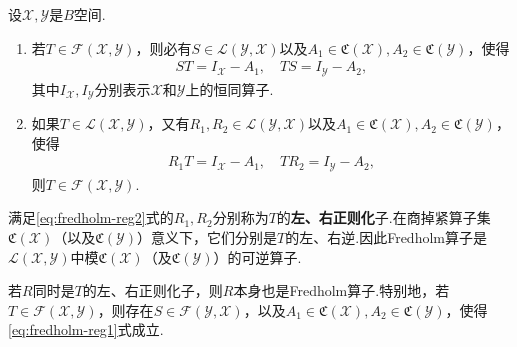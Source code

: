 \documentclass[../../main.tex]{subfiles}%
\begin{document}
\begin{theorem}\label{theorem:泛函分析--Fredholm算子正则化定理}
设$\mathscr{X},\mathscr{Y}$是$B$空间.
\begin{enumerate}[(1)]
\item 若$T\in\mathscr{F}(\mathscr{X},\mathscr{Y})$，则必有$S\in\mathscr{L}(\mathscr{Y},\mathscr{X})$以及$A_1\in\mathfrak{C}(\mathscr{X}),A_2\in\mathfrak{C}(\mathscr{Y})$，使得
\begin{align}
ST=I_{\mathscr{X}}-A_1,\quad TS=I_{\mathscr{Y}}-A_2,\label{eq:fredholm-reg1}
\end{align}
其中$I_{\mathscr{X}},I_{\mathscr{Y}}$分别表示$\mathscr{X}$和$\mathscr{Y}$上的恒同算子.
\item 如果$T\in\mathscr{L}(\mathscr{X},\mathscr{Y})$，又有$R_1,R_2\in\mathscr{L}(\mathscr{Y},\mathscr{X})$以及$A_1\in\mathfrak{C}(\mathscr{X}),A_2\in\mathfrak{C}(\mathscr{Y})$，使得
\begin{align}
R_1T=I_{\mathscr{X}}-A_1,\quad TR_2=I_{\mathscr{Y}}-A_2,\label{eq:fredholm-reg2}
\end{align}
则$T\in\mathscr{F}(\mathscr{X},\mathscr{Y})$.
\end{enumerate}
\end{theorem}
\begin{remark}
满足\eqref{eq:fredholm-reg2}式的$R_1,R_2$分别称为$T$的\textbf{左、右正则化}子.在商掉紧算子集$\mathfrak{C}(\mathscr{X})$（以及$\mathfrak{C}(\mathscr{Y})$）意义下，它们分别是$T$的左、右逆.因此Fredholm算子是$\mathscr{L}(\mathscr{X},\mathscr{Y})$中模$\mathfrak{C}(\mathscr{X})$（及$\mathfrak{C}(\mathscr{Y})$）的可逆算子.

若$R$同时是$T$的左、右正则化子，则$R$本身也是Fredholm算子.特别地，若$T\in\mathscr{F}(\mathscr{X},\mathscr{Y})$，则存在$S\in\mathscr{F}(\mathscr{Y},\mathscr{X})$，以及$A_1\in\mathfrak{C}(\mathscr{X}),A_2\in\mathfrak{C}(\mathscr{Y})$，使得\eqref{eq:fredholm-reg1}式成立.
\end{remark}
\end{document}
